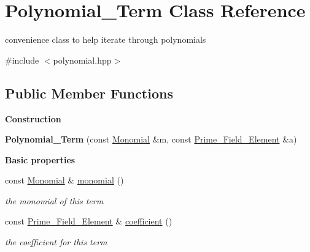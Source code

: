 \hypertarget{class_polynomial___term}{}\section{Polynomial\+\_\+\+Term Class Reference}
\label{class_polynomial___term}


convenience class to help iterate through polynomials  




{\ttfamily \#include $<$polynomial.\+hpp$>$}

\subsection*{Public Member Functions}
\begin{Indent}\textbf{ Construction}\par
\begin{DoxyCompactItemize}
\item 
\mbox{\label{class_polynomial___term_a62dc1c5f38a989c0bfe40520ebc76d74}} 
{\bfseries Polynomial\+\_\+\+Term} (const \hyperlink{class_monomial}{Monomial} \&m, const \hyperlink{class_prime___field___element}{Prime\+\_\+\+Field\+\_\+\+Element} \&a)
\end{DoxyCompactItemize}
\end{Indent}
\begin{Indent}\textbf{ Basic properties}\par
\begin{DoxyCompactItemize}
\item 
\mbox{\label{class_polynomial___term_aeca1117b51f1326a8c4db38837c84f61}} 
const \hyperlink{class_monomial}{Monomial} \& \hyperlink{class_polynomial___term_aeca1117b51f1326a8c4db38837c84f61}{monomial} ()
\begin{DoxyCompactList}\small\item\em the monomial of this term \end{DoxyCompactList}\item 
\mbox{\label{class_polynomial___term_afc61ecc1cd633fd0f758bace614711d1}} 
const \hyperlink{class_prime___field___element}{Prime\+\_\+\+Field\+\_\+\+Element} \& \hyperlink{class_polynomial___term_afc61ecc1cd633fd0f758bace614711d1}{coefficient} ()
\begin{DoxyCompactList}\small\item\em the coefficient for this term \end{DoxyCompactList}\end{DoxyCompactItemize}
\end{Indent}

